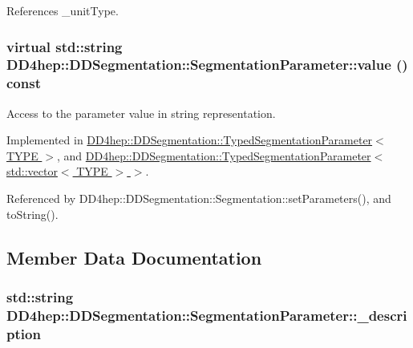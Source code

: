 References \_\-unitType.\hypertarget{class_d_d4hep_1_1_d_d_segmentation_1_1_segmentation_parameter_a633dffe9e53306c5f67568ff5e567387}{
\subsubsection[{value}]{\setlength{\rightskip}{0pt plus 5cm}virtual std::string DD4hep::DDSegmentation::SegmentationParameter::value () const}}
\label{class_d_d4hep_1_1_d_d_segmentation_1_1_segmentation_parameter_a633dffe9e53306c5f67568ff5e567387}


Access to the parameter value in string representation. 

Implemented in \hyperlink{class_d_d4hep_1_1_d_d_segmentation_1_1_typed_segmentation_parameter_a71988bceae6a646bf38ca704d35f9de3}{DD4hep::DDSegmentation::TypedSegmentationParameter$<$ TYPE $>$}, and \hyperlink{class_d_d4hep_1_1_d_d_segmentation_1_1_typed_segmentation_parameter_3_01std_1_1vector_3_01_t_y_p_e_01_4_01_4_aec02d11d6f6bf666b67d22a76f70dafb}{DD4hep::DDSegmentation::TypedSegmentationParameter$<$ std::vector$<$ TYPE $>$ $>$}.

Referenced by DD4hep::DDSegmentation::Segmentation::setParameters(), and toString().

\subsection{Member Data Documentation}
\hypertarget{class_d_d4hep_1_1_d_d_segmentation_1_1_segmentation_parameter_a1b798aa8deadc4d66205109cbe6bc120}{
\subsubsection[{\_\-description}]{\setlength{\rightskip}{0pt plus 5cm}std::string {\bf DD4hep::DDSegmentation::SegmentationParameter::\_\-description}}}
\label{class_d_d4hep_1_1_d_d_segmentation_1_1_segmentation_parameter_a1b798aa8deadc4d66205109cbe6bc120}


